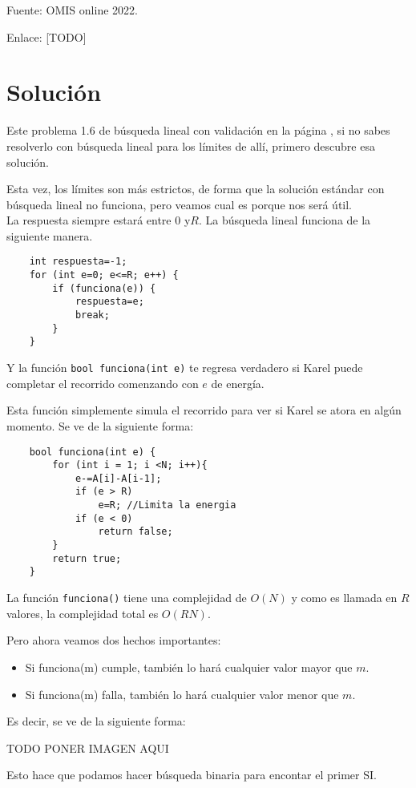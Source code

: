 Fuente: OMIS online 2022.

Enlace: [TODO]

\section*{Solución}
Este problema 1.6 de búsqueda lineal con validación en la página \pageref{bicicleta}, si no sabes resolverlo con búsqueda lineal para los límites de allí, primero descubre esa solución.

Esta vez, los límites son más estrictos, de forma que la solución estándar con búsqueda lineal no funciona, pero veamos cual es porque nos será útil.
\\

La respuesta siempre estará entre \(0\)  y\(R\). La búsqueda lineal funciona de la siguiente manera.
\begin{lstlisting}
	int respuesta=-1;
	for (int e=0; e<=R; e++) {
		if (funciona(e)) {
			respuesta=e;
			break;
		}
	}
\end{lstlisting}

Y la función \verb|bool funciona(int e)| te regresa verdadero si Karel puede completar el recorrido comenzando con \(e\) de energía.

Esta función simplemente simula el recorrido para ver si Karel se atora en algún momento. Se ve de la siguiente forma:

\begin{lstlisting}
	bool funciona(int e) {
		for (int i = 1; i <N; i++){
			e-=A[i]-A[i-1];
			if (e > R) 
				e=R; //Limita la energia
			if (e < 0)
				return false;			
		}
		return true;
	}
\end{lstlisting}

La función \verb|funciona()| tiene una complejidad de \(O(N)\) y como es llamada en \(R\) valores, la complejidad total es \(O(RN)\).

Pero ahora veamos dos hechos importantes:
\begin{itemize}
	\item Si funciona(m) cumple, también lo hará cualquier valor mayor que \(m\).
	\item Si funciona(m) falla, también lo hará cualquier valor menor que \(m\).
\end{itemize}

Es decir, se ve de la siguiente forma:

TODO PONER IMAGEN AQUI

Esto hace que podamos hacer búsqueda binaria para encontar el primer SI.

